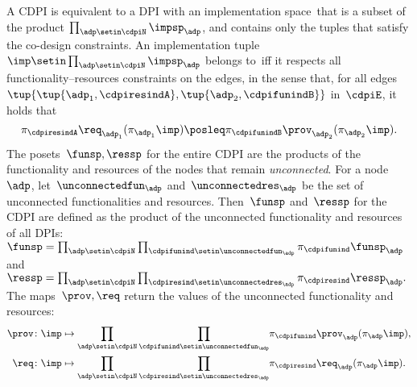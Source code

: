 A CDPI is equivalent to a DPI with an implementation space~\impsp that is a subset of the product $\prod_{\adp\setin\cdpiN}\impsp_{\adp}$, and contains only the tuples that satisfy the co-design constraints.
An implementation tuple~$\imp\setin\prod_{\adp\setin\cdpiN}\impsp_{\adp}$
belongs to~\impsp iff it respects all functionality--resources constraints on the edges, in the sense that, for all edges~$\tup{\tup{ \adp_1,\cdpiresindA} ,\tup{\adp_2,\cdpifunindB}}$
in~$\cdpiE$, it holds that
\begin{equation}
    \pi_{\cdpiresindA}\req_{\adp_1}(\pi_{\adp_1}\imp)\posleq\pi_{\cdpifunindB}\prov_{\adp_2}(\pi_{\adp_2}\imp).
\end{equation}
The posets~$\funsp,\ressp$ for the entire CDPI are the products of the functionality and resources of the nodes that remain \emph{unconnected}.
For a node~$\adp$, let~$\unconnectedfun_{\adp}$ and~$\unconnectedres_{\adp}$ be the set of unconnected functionalities and resources.
Then~$\funsp$ and~$\ressp$ for the CDPI are defined as the product of the unconnected functionality and resources of all DPIs: $\funsp=\prod_{\adp\setin\cdpiN}\prod_{\cdpifunind\setin\unconnectedfun_{\adp}}\pi_{\cdpifunind}\funsp_{\adp}$ and~$\ressp=\prod_{\adp\setin\cdpiN}\prod_{\cdpiresind\setin\unconnectedres_{\adp}}\pi_{\cdpiresind}\ressp_{\adp}.
$
The maps~$\prov,\req$ return the values of the unconnected functionality and resources:
\begin{equation}
    \begin{aligned}
        \prov\colon \imp & \mapsto{\scriptstyle {\displaystyle \prod_{\adp\setin\cdpiN}\prod_{\cdpifunind\setin\unconnectedfun_{\adp}}}}\pi_{\cdpifunind}\prov_{\adp}(\pi_{\adp}\imp), \\
        \req\colon \imp  & \mapsto{\displaystyle \prod_{\adp\setin\cdpiN}\prod_{\cdpiresind\setin\unconnectedres_{\adp}}}\pi_{\cdpiresind}\req_{\adp}(\pi_{\adp}\imp).
    \end{aligned}
\end{equation}

